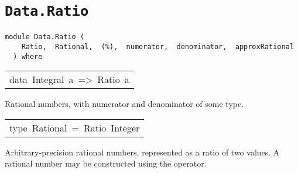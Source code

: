 \chapter{\texttt{Data.Ratio}}
\label{module:Data.Ratio}
\haddockbeginheader
{\haddockverb\begin{verbatim}
module Data.Ratio (
    Ratio,  Rational,  (%),  numerator,  denominator,  approxRational
  ) where\end{verbatim}}
\haddockendheader

\begin{haddockdesc}
\item[\begin{tabular}{@{}l}
data\ Integral\ a\ =>\ Ratio\ a
\end{tabular}]\haddockbegindoc
Rational numbers, with numerator and denominator of some  type.
\par

\end{haddockdesc}
\begin{haddockdesc}
\item[\begin{tabular}{@{}l}
instance\ Integral\ a\ =>\ Enum\ (Ratio\ a)\\instance\ Integral\ a\ =>\ Eq\ (Ratio\ a)\\instance\ Integral\ a\ =>\ Fractional\ (Ratio\ a)\\instance\ Integral\ a\ =>\ Num\ (Ratio\ a)\\instance\ Integral\ a\ =>\ Ord\ (Ratio\ a)\\instance\ (Integral\ a,\ Read\ a)\ =>\ Read\ (Ratio\ a)\\instance\ Integral\ a\ =>\ Real\ (Ratio\ a)\\instance\ Integral\ a\ =>\ RealFrac\ (Ratio\ a)\\instance\ Integral\ a\ =>\ Show\ (Ratio\ a)
\end{tabular}]
\end{haddockdesc}
\begin{haddockdesc}
\item[\begin{tabular}{@{}l}
type\ Rational\ =\ Ratio\ Integer
\end{tabular}]\haddockbegindoc
Arbitrary-precision rational numbers, represented as a ratio of
 two  values.  A rational number may be constructed using
 the  operator.
\par

\end{haddockdesc}
